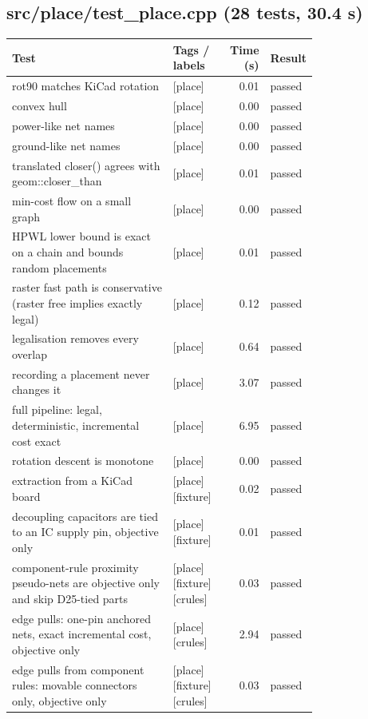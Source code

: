 \subsection*{src/\allowbreak{}place/\allowbreak{}test\_\allowbreak{}place.cpp (28 tests, 30.4 s)}
\begin{longtable}{@{}p{0.57\linewidth}p{0.19\linewidth}rl@{}}
\toprule Test & Tags / labels & Time (s) & Result \\ \midrule \endhead
rot90 matches KiCad rotation & {\footnotesize [place]} & 0.01 & passed \\
convex hull & {\footnotesize [place]} & 0.00 & passed \\
power-like net names & {\footnotesize [place]} & 0.00 & passed \\
ground-like net names & {\footnotesize [place]} & 0.00 & passed \\
translated closer() agrees with geom::closer\_than & {\footnotesize [place]} & 0.01 & passed \\
min-cost flow on a small graph & {\footnotesize [place]} & 0.00 & passed \\
HPWL lower bound is exact on a chain and bounds random placements & {\footnotesize [place]} & 0.01 & passed \\
raster fast path is conservative (raster free implies exactly legal) & {\footnotesize [place]} & 0.12 & passed \\
legalisation removes every overlap & {\footnotesize [place]} & 0.64 & passed \\
recording a placement never changes it & {\footnotesize [place]} & 3.07 & passed \\
full pipeline: legal, deterministic, incremental cost exact & {\footnotesize [place]} & 6.95 & passed \\
rotation descent is monotone & {\footnotesize [place]} & 0.00 & passed \\
extraction from a KiCad board & {\footnotesize [place][fixture]} & 0.02 & passed \\
decoupling capacitors are tied to an IC supply pin, objective only & {\footnotesize [place][fixture]} & 0.01 & passed \\
component-rule proximity pseudo-nets are objective only and skip D25-tied parts & {\footnotesize [place][fixture][crules]} & 0.03 & passed \\
edge pulls: one-pin anchored nets, exact incremental cost, objective only & {\footnotesize [place][crules]} & 2.94 & passed \\
edge pulls from component rules: movable connectors only, objective only & {\footnotesize [place][fixture][crules]} & 0.03 & passed \\

\end{longtable}
